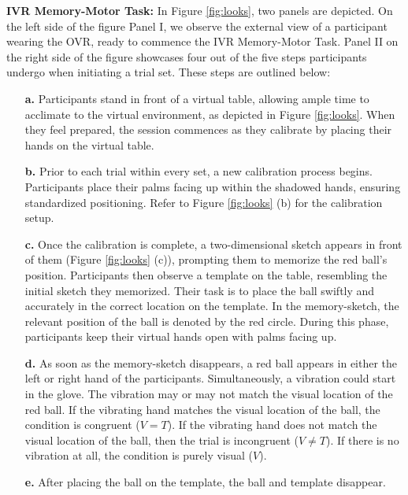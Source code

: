 \documentclass[12pt,oneside,openright]{report}
\begin{document}
\textbf{IVR Memory-Motor Task:} In Figure \ref{fig:looks}, two panels are depicted. On the left side of the figure Panel I, we observe the external view of a participant wearing the OVR, ready to commence the IVR Memory-Motor Task. Panel II on the right side of the figure showcases four out of the five steps participants undergo when initiating a trial set. These steps are outlined below:

\begin{enumerate}
    \item[\textbf{a.}] Participants stand in front of a virtual table, allowing ample time to acclimate to the virtual environment, as depicted in Figure \ref{fig:looks}. When they feel prepared, the session commences as they calibrate by placing their hands on the virtual table.
    \item[\textbf{b.}] Prior to each trial within every set, a new calibration process begins. Participants place their palms facing up within the shadowed hands, ensuring standardized positioning. Refer to Figure \ref{fig:looks} (b) for the calibration setup.
    \item[\textbf{c.}] Once the calibration is complete, a two-dimensional sketch appears in front of them (Figure \ref{fig:looks} (c)), prompting them to memorize the red ball's position. Participants then observe a template on the table, resembling the initial sketch they memorized. Their task is to place the ball swiftly and accurately in the correct location on the template. In the memory-sketch, the relevant position of the ball is denoted by the red circle. During this phase, participants keep their virtual hands open with palms facing up.
    \item[\textbf{d.}] As soon as the memory-sketch disappears, a red ball appears in either the left or right hand of the participants. Simultaneously, a vibration could start in the glove. The vibration may or may not match the visual location of the red ball. If the vibrating hand matches the visual location of the ball, the condition is congruent ($V=T$). If the vibrating hand does not match the visual location of the ball, then the trial is incongruent ($V \neq T$). If there is no vibration at all, the condition is purely visual ($V$).
    \item[\textbf{e.}] After placing the ball on the template, the ball and template disappear. 
\end{enumerate}
\end{document}
